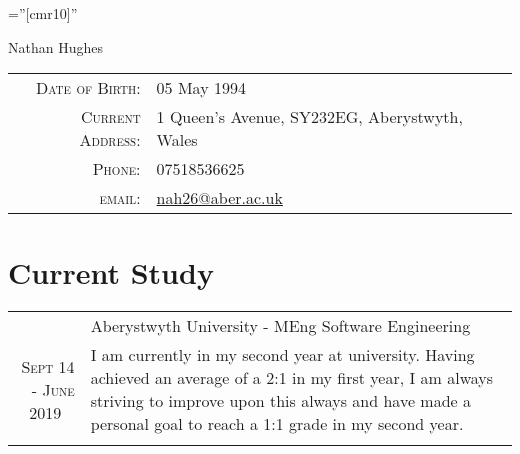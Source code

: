 \documentclass[a4paper,10pt]{article}
\begin{document}
\pagestyle{empty} %

\font\fb=''[cmr10]'' %

\par{\centering
  {\Huge Nathan {Hughes}
  }\bigskip\par}


\begin{center}
  \begin{tabular}{rl}
    \textsc{Date of Birth:} & 05 		May 1994 \\
    \textsc{Current Address:}   & 1 Queen's Avenue, SY232EG, Aberystwyth, 			Wales \\
    \textsc{Phone:}     & 07518536625\\
    \textsc{email:}     & \href{mailto:nah26@aber.ac.uk}{nah26@aber.ac.uk}
  \end{tabular}
\end{center}




\section{Current Study}


\begin{tabular}{rp{11cm}}
  &Aberystwyth University - MEng Software Engineering\\\textsc{Sept 14 - June 2019 \  }&\footnotesize{I am currently in my second year at university. Having achieved an average of a 2:1 in my first year, I am always striving to improve upon this always and have made a personal goal to reach a 1:1 grade in my second year.}\\\multicolumn{2}{c}{} \\
  


\end{tabular}
\end{document}
